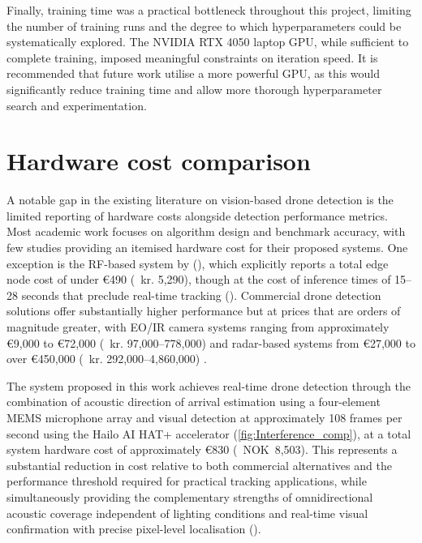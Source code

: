 \vspace{1em}

Finally, training time was a practical bottleneck throughout this project, limiting the number of training runs and the degree to which hyperparameters could be systematically explored. The NVIDIA RTX 4050 laptop GPU, while sufficient to complete training, imposed meaningful constraints on iteration speed. It is recommended that future work utilise a more powerful GPU, as this would significantly reduce training time and allow more thorough hyperparameter search and experimentation.

\section{Hardware cost comparison}

A notable gap in the existing literature on vision-based drone detection is the limited reporting of hardware costs alongside detection performance metrics. Most academic work focuses on algorithm design and benchmark accuracy, with few studies providing an itemised hardware cost for their proposed systems. One exception is the RF-based system by (\cite{swinney2022lowcost}), which explicitly reports a total edge node cost of under €490 (~kr. 5,290), though at the cost of inference times of 15–28 seconds that preclude real-time tracking (\cite{swinney2022lowcost}). Commercial drone detection solutions offer substantially higher performance but at prices that are orders of magnitude greater, with EO/IR camera systems ranging from approximately €9,000 to €72,000 (~kr. 97,000–778,000) and radar-based systems from €27,000 to over €450,000 (~kr. 292,000–4,860,000) \cite{airsight2025buyersguide}.

The system proposed in this work achieves real-time drone 
detection through the combination of acoustic direction of 
arrival estimation using a four-element MEMS microphone 
array and visual detection at approximately 108 frames per 
second using the Hailo AI HAT+ accelerator 
(\ref{fig:Interference_comp}), at a total system hardware cost of 
approximately €830 (~NOK~8,503). This represents a substantial 
reduction in cost relative to both commercial alternatives 
and the performance threshold required for practical tracking 
applications, while simultaneously providing the 
complementary strengths of omnidirectional acoustic coverage 
independent of lighting conditions and real-time visual 
confirmation with precise pixel-level localisation 
(\cite{seidaliyeva2024advances, macedo2025drone}).
\vspace{1em}


